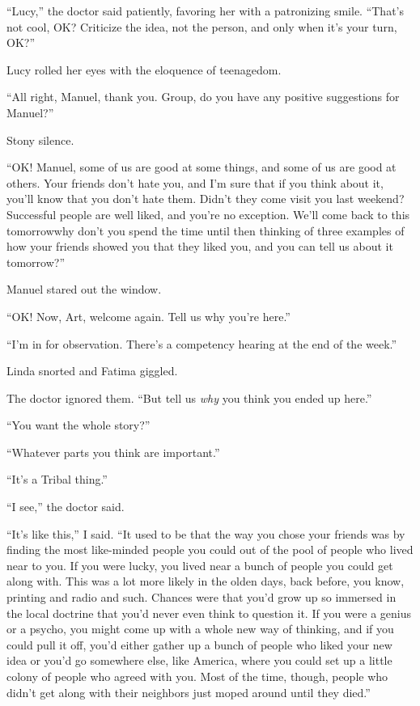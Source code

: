 “Lucy,” the doctor said patiently, favoring her with a patronizing
smile. “That’s not cool, OK? Criticize the idea, not the person,
and only when it’s your turn, OK?”

Lucy rolled her eyes with the eloquence of teenagedom.

“All right, Manuel, thank you. Group, do you have any positive
suggestions for Manuel?”

Stony silence.

“OK! Manuel, some of us are good at some things, and some of us are
good at others. Your friends don’t hate you, and I’m sure that if
you think about it, you’ll know that you don’t hate them. Didn’t
they come visit you last weekend? Successful people are well liked,
and you’re no exception. We’ll come back to this tomorrow{\dash}why don’t
you spend the time until then thinking of three examples of how
your friends showed you that they liked you, and you can tell us
about it tomorrow?”

Manuel stared out the window.

“OK! Now, Art, welcome again. Tell us why you’re here.”

“I’m in for observation. There’s a competency hearing at the end of
the week.”

Linda snorted and Fatima giggled.

The doctor ignored them. “But tell us \emph{why} you think you
ended up here.”

“You want the whole story?”

“Whatever parts you think are important.”

“It’s a Tribal thing.”

“I see,” the doctor said.

“It’s like this,” I said. “It used to be that the way you chose
your friends was by finding the most like-minded people you could
out of the pool of people who lived near to you. If you were lucky,
you lived near a bunch of people you could get along with. This was
a lot more likely in the olden days, back before, you know,
printing and radio and such. Chances were that you’d grow up so
immersed in the local doctrine that you’d never even think to
question it. If you were a genius or a psycho, you might come up
with a whole new way of thinking, and if you could pull it off,
you’d either gather up a bunch of people who liked your new idea or
you’d go somewhere else, like America, where you could set up a
little colony of people who agreed with you. Most of the time,
though, people who didn’t get along with their neighbors just moped
around until they died.”

